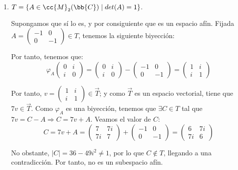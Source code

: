 \begin{ejercicio}
\begin{enumerate}
        \item $T = \{A \in \cc{M}_2(\bb{C}) \mid det(A) = 1\}$.

        Supongamos que sí lo es, y por consiguiente que es un espacio afín. Fijada
        $A=\left(\begin{array}{cc}
                -1 & 0 \\
                0 & -1
            \end{array}\right)\in T$, tenemos la siguiente biyección:

        Por tanto, tenemos que:
        \begin{equation*}
            \varphi_A \left(\begin{array}{cc}
                0 & i \\
                i & 0
            \end{array}\right) = \left(\begin{array}{cc}
                0 & i \\
                i & 0
            \end{array}\right) - \left(\begin{array}{cc}
                -1 & 0 \\
                0 & -1
            \end{array}\right) = \left(\begin{array}{cc}
                1 & i \\
                i & 1
            \end{array}\right)
        \end{equation*}

        Por tanto, $v=\left(\begin{array}{cc}
                1 & i \\
                i & 1
            \end{array}\right)\in \vec{T}$; y como $\vec{T}$ es un espacio vectorial, tiene que $7v\in \vec{T}$. Como $\varphi_A$ es una biyección, tenemos que $\exists C\in T$ tal que $7v = C-A \Longrightarrow C = 7v + A$. Veamos el valor de $C$:
            \begin{equation*}
                C = 7v+A = \left(\begin{array}{cc}
                7 & 7i \\
                7i & 7
            \end{array}\right) + \left(\begin{array}{cc}
                -1 & 0 \\
                0 & -1
            \end{array}\right) = \left(\begin{array}{cc}
                6 & 7i \\
                7i & 6
            \end{array}\right)
            \end{equation*}

        No obstante, $|C| = 36 - 49i^2 \neq 1$, por lo que $C\notin T$, llegando a una contradicción. Por tanto, no es un subespacio afín.
    \end{enumerate}
\end{ejercicio}


